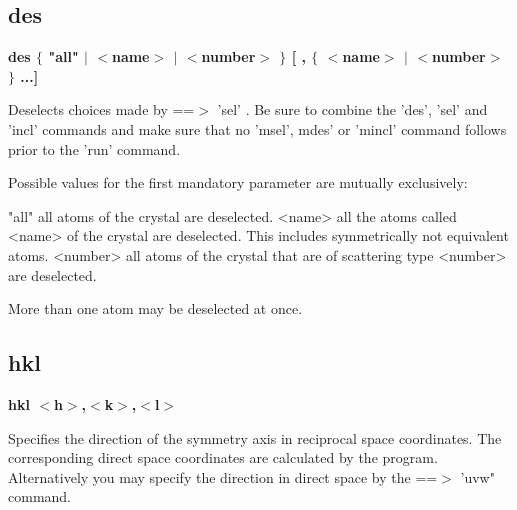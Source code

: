 \subsection*{des}
{\bf des $ \{$ "all" $| $ $ <$name$> $ $| $ $ <$number$> $ $\} $ [ , $ \{$ $ <$name$> $ $| $ $ <$number$> $ $\} $ ...] \par }
\par
\vspace{3pt}
Deselects choices made by ==$> $ 'sel' . 
Be sure to combine the 'des', 'sel' and 'incl' commands and 
make sure that no 'msel', mdes' or 'mincl' command follows 
prior to the 'run' command. 
\par
Possible values for the first mandatory parameter are 
mutually exclusively: 
\par
\begin{MacVerbatim}
"all"     all atoms of the crystal are deselected.
<name>    all the atoms called <name> of the crystal are deselected.
          This includes symmetrically not equivalent atoms.
<number>  all atoms of the crystal that are of scattering type <number>
          are deselected.
\end{MacVerbatim}
More than one atom may be deselected at once. 
\subsection*{hkl}
{\bf hkl $ <$h$> $,$ <$k$> $,$ <$l$> $ \par }
\par
\vspace{3pt}
Specifies the direction of the symmetry axis in reciprocal space 
coordinates. The corresponding direct space coordinates are calculated 
by the program. 
Alternatively you may specify the direction in direct space by the 
==$> $ 'uvw" command. 

